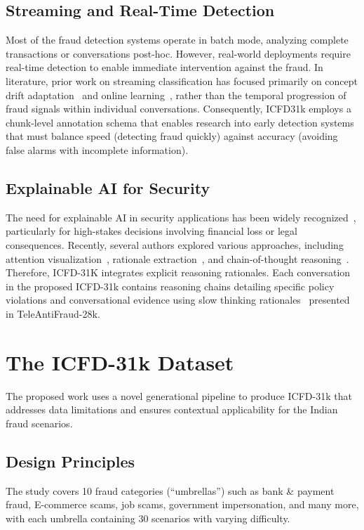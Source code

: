 \documentclass{article}
\begin{document}
\subsection{Streaming and Real-Time Detection}

Most of the fraud detection systems operate in batch mode, analyzing complete transactions or conversations post-hoc. However, real-world deployments require real-time detection to enable immediate intervention against the fraud. In literature, prior work on streaming classification has focused primarily on concept drift adaptation~\cite{gama2014survey} and online learning~\cite{hoi2021online}, rather than the temporal progression of fraud signals within individual conversations. Consequently, ICFD31k employs a chunk-level annotation schema that enables research into early detection systems that must balance speed (detecting fraud quickly) against accuracy (avoiding false alarms with incomplete information). 

\subsection{Explainable AI for Security}

The need for explainable AI in security applications has been widely recognized~\cite{arrieta2020explainable}, particularly for high-stakes decisions involving financial loss or legal consequences. Recently, several authors explored various approaches, including attention visualization~\cite{wiegreffe2019attention}, rationale extraction~\cite{lei2016rationalizing}, and chain-of-thought reasoning~\cite{wei2022chain}. Therefore, ICFD-31K integrates explicit reasoning rationales. Each conversation in the proposed ICFD-31k contains reasoning chains detailing specific policy violations and conversational evidence using slow thinking rationales~\cite{Ma2025} presented in TeleAntiFraud-28k.


\section{The ICFD-31k Dataset}
\label{sec:dataset}
The proposed work uses a novel generational pipeline to produce ICFD-31k that addresses data limitations and ensures contextual applicability for the Indian fraud scenarios. 

\subsection{Design Principles}
The study covers 10 fraud categories (``umbrellas'')  such as bank \& payment fraud, E-commerce scams, job scams, government impersonation, and many more, with each umbrella containing 30 scenarios with varying difficulty.
\end{document}
